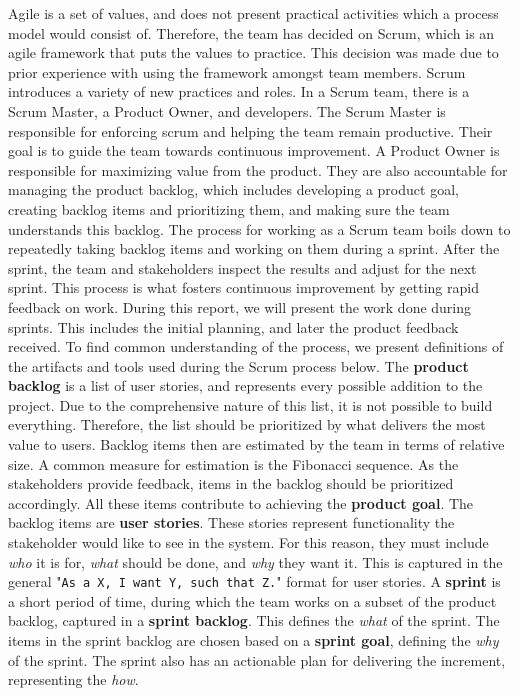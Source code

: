 Agile is a set of values, and does not present practical activities which a process model would consist of. Therefore, the team has decided on Scrum, which is an agile framework that puts the values to practice. This decision was made due to prior experience with using the framework amongst team members.
Scrum introduces a variety of new practices and roles. In a Scrum team, there is a Scrum Master, a Product Owner, and developers. The Scrum Master is responsible for enforcing scrum and helping the team remain productive. Their goal is to guide the team towards continuous improvement. A Product Owner is responsible for maximizing value from the product. They are also accountable for managing the product backlog, which includes developing a product goal, creating backlog items and prioritizing them, and making sure the team understands this backlog.
The process for working as a Scrum team boils down to repeatedly taking backlog items and working on them during a sprint. After the sprint, the team and stakeholders inspect the results and adjust for the next sprint. This process is what fosters continuous improvement by getting rapid feedback on work.
During this report, we will present the work done during sprints. This includes the initial planning, and later the product feedback received.
To find common understanding of the process, we present definitions of the artifacts and tools used during the Scrum process below.
The \textbf{product backlog} is a list of user stories, and represents every possible addition to the project. Due to the comprehensive nature of this list, it is not possible to build everything. Therefore, the list should be prioritized by what delivers the most value to users.
Backlog items then are estimated by the team in terms of relative size. A common measure for estimation is the Fibonacci sequence.
As the stakeholders provide feedback, items in the backlog should be prioritized accordingly. All these items contribute to achieving the \textbf{product goal}.
The backlog items are \textbf{user stories}. These stories represent functionality the stakeholder would like to see in the system. For this reason, they must include \textit{who} it is for, \textit{what} should be done, and \textit{why} they want it. This is captured in the general "\texttt{As a X, I want Y, such that Z.}" format for user stories.
A \textbf{sprint} is a short period of time, during which the team works on a subset of the product backlog, captured in a \textbf{sprint backlog}. This defines the \textit{what} of the sprint. The items in the sprint backlog are chosen based on a \textbf{sprint goal}, defining the \textit{why} of the sprint. The sprint also has an actionable plan for delivering the increment, representing the \textit{how}.
